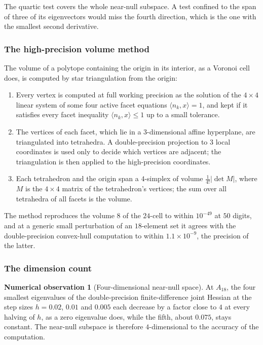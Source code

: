 \documentclass[11pt,reqno]{amsart}
\renewcommand{\_}{\origunderscore\allowbreak}
\numberwithin{equation}{section}
\theoremstyle{plain}
\theoremstyle{definition}
\newtheorem{numobs}[thm]{Numerical observation}
\theoremstyle{remark}
\begin{document}
The quartic test covers the whole near-null subspace. A test confined
to the span of three of its eigenvectors would miss the fourth
direction, which is the one with the smallest second derivative.

\subsubsection{The high-precision volume method}\label{sec:hp-volume-method}

The volume of a polytope containing the origin in its interior, as a
Voronoi cell does, is computed by star triangulation from the origin:
\begin{enumerate}[leftmargin=2em]
\item Every vertex is computed at full working precision as the
solution of the $4\times4$ linear system of some four active facet
equations $\langle n_k,x\rangle=1$, and kept if it satisfies every
facet inequality $\langle n_k,x\rangle\le1$ up to a small tolerance.
\item The vertices of each facet, which lie in a $3$-dimensional affine
hyperplane, are triangulated into tetrahedra. A double-precision
projection to $3$ local coordinates is used only to decide which
vertices are adjacent; the triangulation is then applied to the
high-precision coordinates.
\item Each tetrahedron and the origin span a $4$-simplex of volume
$\tfrac1{4!}|\det M|$, where $M$ is the $4\times4$ matrix of the
tetrahedron's vertices; the sum over all tetrahedra of all facets is the
volume.
\end{enumerate}
The method reproduces the volume $8$ of the $24$-cell to within
$10^{-49}$ at $50$ digits, and at a generic small perturbation of an
$18$-element set it agrees with the double-precision convex-hull
computation to within $1.1\times10^{-9}$, the precision of the latter.

\subsubsection{The dimension count}\label{sec:dim-count-new}

\begin{numobs}[Four-dimensional near-null space]\label{prop:4d-nullspace-new}
At $A_{18}$, the four smallest eigenvalues of the double-precision
finite-difference joint Hessian at the step sizes $h=0.02$, $0.01$ and
$0.005$ each decrease by a factor close to $4$ at every halving of $h$,
as a zero eigenvalue does, while the fifth, about $0.075$, stays
constant. The near-null subspace is therefore $4$-dimensional to the
accuracy of the computation.
\end{numobs}
\end{document}
